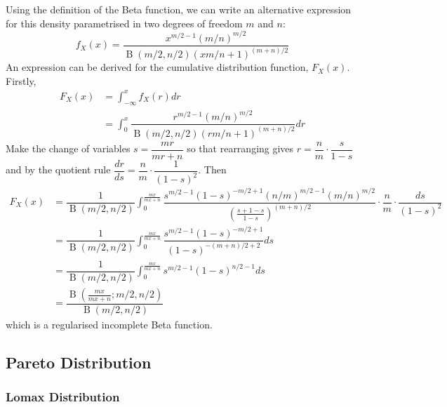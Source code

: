 \documentclass[11pt]{report} %
\begin{document}
Using the definition of the Beta function, we can write an alternative expression for this density parametrised in two degrees of freedom $m$ and $n$:
\begin{equation}
f_{X}\left(x\right) = \dfrac{x^{m/2 - 1}\left(m/n\right)^{m/2}}{\operatorname{B}\left(m/2, n/2\right)\left(xm/n + 1\right)^{\left(m + n\right)/2}}
\end{equation}
An expression can be derived for the cumulative distribution function, $F_{X}\left(x\right)$. Firstly,
\begin{align}
F_{X}\left(x\right) &= \int_{-\infty}^{x}f_{X}\left(r\right)dr \\
&= \int_{0}^{x}\dfrac{r^{m/2 - 1}\left(m/n\right)^{m/2}}{\operatorname{B}\left(m/2, n/2\right)\left(rm/n + 1\right)^{\left(m + n\right)/2}}dr
\end{align}
Make the change of variables $s = \dfrac{mr}{mr + n}$ so that rearranging gives $r = \dfrac{n}{m}\cdot\dfrac{s}{1 - s}$ and by the quotient rule $\dfrac{dr}{ds} = \dfrac{n}{m}\cdot\dfrac{1}{\left(1 - s\right)^{2}}$. Then
\begin{align}
F_{X}\left(x\right) &= \dfrac{1}{\operatorname{B}\left(m/2, n/2\right)}\int_{0}^{\frac{mx}{mx + n}}\dfrac{s^{m/2 - 1}\left(1 - s\right)^{-m/2 + 1}\left(n/m\right)^{m/2 - 1}\left(m/n\right)^{m/2}}{\left(\frac{s + 1 - s}{1 - s}\right)^{\left(m + n\right)/2}}\cdot\dfrac{n}{m}\cdot\dfrac{ds}{\left(1 - s\right)^{2}} \\
&= \dfrac{1}{\operatorname{B}\left(m/2, n/2\right)}\int_{0}^{\frac{mx}{mx + n}}\dfrac{s^{m/2 - 1}\left(1 - s\right)^{-m/2 + 1}}{\left(1 - s\right)^{-\left(m + n\right)/2 + 2}}ds \\
&= \dfrac{1}{\operatorname{B}\left(m/2, n/2\right)}\int_{0}^{\frac{mx}{mx + n}}s^{m/2 - 1}\left(1 - s\right)^{n/2 - 1}ds \\
&= \dfrac{\operatorname{B}\left(\frac{mx}{mx + n}; m/2, n/2\right)}{\operatorname{B}\left(m/2, n/2\right)}
\end{align}
which is a regularised incomplete Beta function.

\subsection{Pareto Distribution}

\subsubsection{Lomax Distribution}
\end{document}

